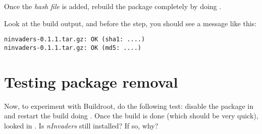 Once the {\em hash file} is added, rebuild the package completely by
doing .

Look at the build output, and before the  step, you should see a message like this:

\begin{verbatim}
ninvaders-0.1.1.tar.gz: OK (sha1: ....)
ninvaders-0.1.1.tar.gz: OK (md5: ....)
\end{verbatim}

\section{Testing package removal}

Now, to experiment with Buildroot, do the following test: disable the
 package in  and restart the build
doing . Once the build is done (which should be very
quick), looked in . Is {\em nInvaders} still
installed? If so, why?
